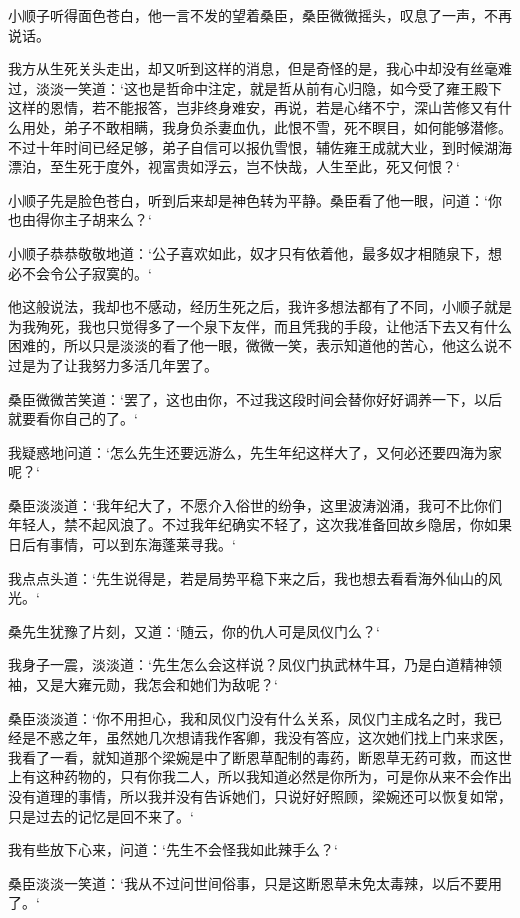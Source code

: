 小顺子听得面色苍白，他一言不发的望着桑臣，桑臣微微摇头，叹息了一声，不再说话。

我方从生死关头走出，却又听到这样的消息，但是奇怪的是，我心中却没有丝毫难过，淡淡一笑道：‘这也是哲命中注定，就是哲从前有心归隐，如今受了雍王殿下这样的恩情，若不能报答，岂非终身难安，再说，若是心绪不宁，深山苦修又有什么用处，弟子不敢相瞒，我身负杀妻血仇，此恨不雪，死不瞑目，如何能够潜修。不过十年时间已经足够，弟子自信可以报仇雪恨，辅佐雍王成就大业，到时候湖海漂泊，至生死于度外，视富贵如浮云，岂不快哉，人生至此，死又何恨？‘

小顺子先是脸色苍白，听到后来却是神色转为平静。桑臣看了他一眼，问道：‘你也由得你主子胡来么？‘

小顺子恭恭敬敬地道：‘公子喜欢如此，奴才只有依着他，最多奴才相随泉下，想必不会令公子寂寞的。‘

他这般说法，我却也不感动，经历生死之后，我许多想法都有了不同，小顺子就是为我殉死，我也只觉得多了一个泉下友伴，而且凭我的手段，让他活下去又有什么困难的，所以只是淡淡的看了他一眼，微微一笑，表示知道他的苦心，他这么说不过是为了让我努力多活几年罢了。

桑臣微微苦笑道：‘罢了，这也由你，不过我这段时间会替你好好调养一下，以后就要看你自己的了。‘

我疑惑地问道：‘怎么先生还要远游么，先生年纪这样大了，又何必还要四海为家呢？‘

桑臣淡淡道：‘我年纪大了，不愿介入俗世的纷争，这里波涛汹涌，我可不比你们年轻人，禁不起风浪了。不过我年纪确实不轻了，这次我准备回故乡隐居，你如果日后有事情，可以到东海蓬莱寻我。‘

我点点头道：‘先生说得是，若是局势平稳下来之后，我也想去看看海外仙山的风光。‘

桑先生犹豫了片刻，又道：‘随云，你的仇人可是凤仪门么？‘

我身子一震，淡淡道：‘先生怎么会这样说？凤仪门执武林牛耳，乃是白道精神领袖，又是大雍元勋，我怎会和她们为敌呢？‘

桑臣淡淡道：‘你不用担心，我和凤仪门没有什么关系，凤仪门主成名之时，我已经是不惑之年，虽然她几次想请我作客卿，我没有答应，这次她们找上门来求医，我看了一看，就知道那个梁婉是中了断恩草配制的毒药，断恩草无药可救，而这世上有这种药物的，只有你我二人，所以我知道必然是你所为，可是你从来不会作出没有道理的事情，所以我并没有告诉她们，只说好好照顾，梁婉还可以恢复如常，只是过去的记忆是回不来了。‘

我有些放下心来，问道：‘先生不会怪我如此辣手么？‘

桑臣淡淡一笑道：‘我从不过问世间俗事，只是这断恩草未免太毒辣，以后不要用了。‘

